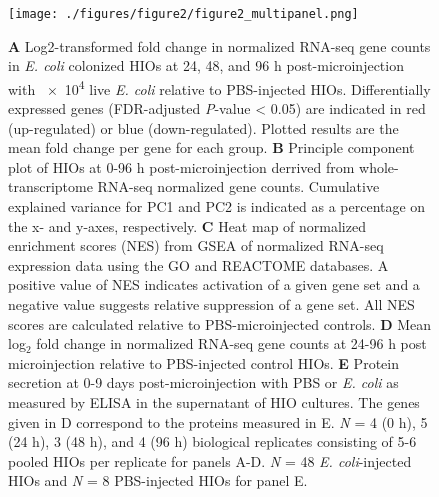 \documentclass[9pt,lineo]{elife}
\begin{document}
\begin{figure}
\begin{fullwidth}
\centering
\texttt{[image: ./figures/figure2/figure2\_multipanel.png]}
\caption{\textbf{A} Log2-transformed fold change in normalized RNA-seq gene counts in \textit{E. coli} colonized HIOs at 24, 48, and 96 h post-microinjection with \num{e4} live \textit{E. coli} relative to PBS-injected HIOs. Differentially expressed genes (FDR-adjusted \textit{P}-value < 0.05) are indicated in red (up-regulated) or blue (down-regulated). Plotted results are the mean fold change per gene for each group. \textbf{B} Principle component plot of HIOs at 0-96 h post-microinjection derrived from whole-transcriptome RNA-seq normalized gene counts. Cumulative explained variance for PC1 and PC2 is indicated as a percentage on the x- and y-axes, respectively. \textbf{C} Heat map of normalized enrichment scores (NES) from GSEA of normalized RNA-seq expression data using the GO and REACTOME databases. A positive value of NES indicates activation of a given gene set and a negative value suggests relative suppression of a gene set. All NES scores are calculated relative to PBS-microinjected controls. \textbf{D} Mean log$_{2}$ fold change in normalized RNA-seq gene counts at 24-96 h post microinjection relative to PBS-injected control HIOs. \textbf{E} Protein secretion at 0-9 days post-microinjection with PBS or \textit{E. coli} as measured by ELISA in the supernatant of HIO cultures. The genes given in D correspond to the proteins measured in E. \textit{N} = 4 (0 h), 5 (24 h), 3 (48 h), and 4 (96 h) biological replicates consisting of 5-6 pooled HIOs per replicate for panels A-D. \textit{N} = 48 \textit{E. coli}-injected HIOs and \textit{N} = 8 PBS-injected HIOs for panel E.}
\label{fig:fullwidth}
\end{fullwidth}
\end{figure}
\end{document}
